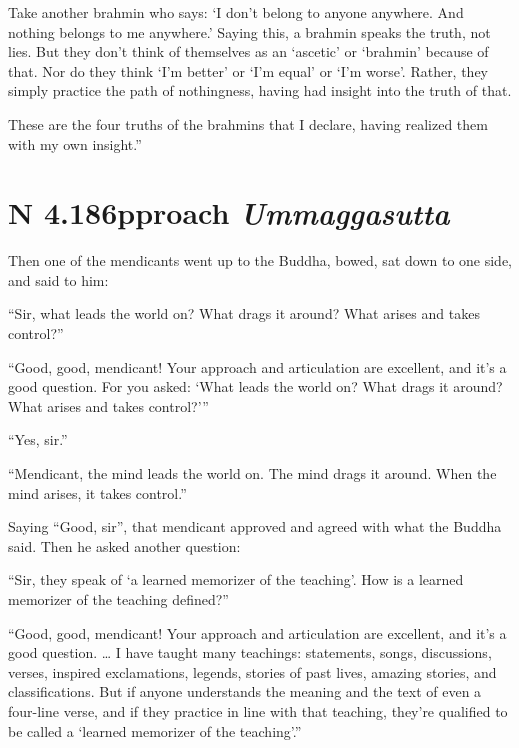 \documentclass[12pt,openany]{book}%
\newcommand*{\suttatitleacronym}[1]{\smaller[2]{#1}\vspace*{.3em}}
\newcommand*{\suttatitletranslation}[1]{\linebreak{#1}}
\newcommand*{\suttatitleroot}[1]{\linebreak\smaller[2]\itshape{#1}}
\newcommand*{\tocacronym}[1]{\hspace*{-3.3em}{#1}\quad}
\newcommand*{\toctranslation}[1]{#1}
\newcommand*{\tocroot}[1]{(\textit{#1})}
\begin{document}
Take another brahmin who says: ‘I don’t belong to anyone anywhere. And nothing belongs to me anywhere.’ Saying this, a brahmin speaks the truth, not lies. But they don’t think of themselves as an ‘ascetic’ or ‘brahmin’ because of that. Nor do they think ‘I’m better’ or ‘I’m equal’ or ‘I’m worse’. Rather, they simply practice the path of nothingness, having had insight into the truth of that. 

These are the four truths of the brahmins that I declare, having realized them with my own insight.” 

%
\section*{{\suttatitleacronym AN 4.186}{\suttatitletranslation Approach }{\suttatitleroot Ummaggasutta}}
\addcontentsline{toc}{section}{\tocacronym{AN 4.186} \toctranslation{Approach } \tocroot{Ummaggasutta}}

Then one of the mendicants went up to the Buddha, bowed, sat down to one side, and said to him: 

“Sir, what leads the world on? What drags it around? What arises and takes control?” 

“Good, good, mendicant! Your approach and articulation are excellent, and it’s a good question. For you asked: ‘What leads the world on? What drags it around? What arises and takes control?’” 

“Yes, sir.” 

“Mendicant, the mind leads the world on. The mind drags it around. When the mind arises, it takes control.” 

Saying “Good, sir”, that mendicant approved and agreed with what the Buddha said. Then he asked another question: 

“Sir, they speak of ‘a learned memorizer of the teaching’. How is a learned memorizer of the teaching defined?” 

“Good, good, mendicant! Your approach and articulation are excellent, and it’s a good question. … I have taught many teachings: statements, songs, discussions, verses, inspired exclamations, legends, stories of past lives, amazing stories, and classifications. But if anyone understands the meaning and the text of even a four-line verse, and if they practice in line with that teaching, they’re qualified to be called a ‘learned memorizer of the teaching’.” 
\end{document}
